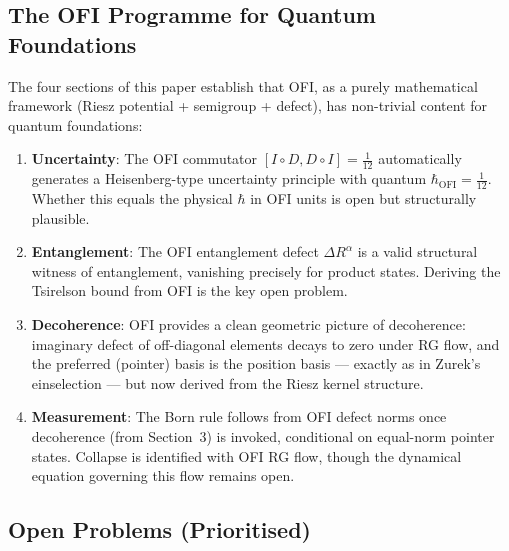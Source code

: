 \documentclass[12pt]{article}
\theoremstyle{definition}
\newcommand{\OFI}{\mathrm{OFI}}
\begin{document}
\subsection{The OFI Programme for Quantum Foundations}

The four sections of this paper establish that OFI, as a purely
mathematical framework (Riesz potential + semigroup + defect), has
non-trivial content for quantum foundations:

\begin{enumerate}[leftmargin=2em]
\item \textbf{Uncertainty}: The OFI commutator $[I\circ D, D\circ I]=\tfrac{1}{12}$
  automatically generates a Heisenberg-type uncertainty principle with
  quantum $\hbar_{\OFI} = \tfrac{1}{12}$.  Whether this equals the
  physical $\hbar$ in OFI units is open but structurally plausible.

\item \textbf{Entanglement}: The OFI entanglement defect $\Delta R^\alpha$
  is a valid structural witness of entanglement, vanishing precisely for
  product states.  Deriving the Tsirelson bound from OFI is the key open
  problem.

\item \textbf{Decoherence}: OFI provides a clean geometric picture of
  decoherence: imaginary defect of off-diagonal elements decays to zero
  under RG flow, and the preferred (pointer) basis is the position basis —
  exactly as in Zurek's einselection — but now derived from the Riesz
  kernel structure.

\item \textbf{Measurement}: The Born rule follows from OFI defect norms
  once decoherence (from Section~3) is invoked, conditional on equal-norm
  pointer states.  Collapse is identified with OFI RG flow, though the
  dynamical equation governing this flow remains open.
\end{enumerate}

\subsection{Open Problems (Prioritised)}
\end{document}

